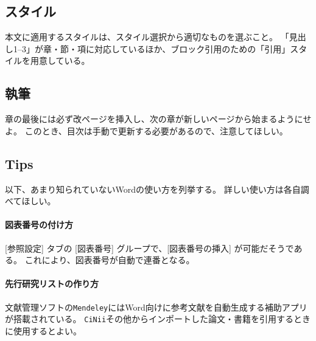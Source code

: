 		\subsection{スタイル}
			\label{sub:style_w}

			本文に適用するスタイルは、スタイル選択から適切なものを選ぶこと。
			「見出し1--3」が章・節・項に対応しているほか、ブロック引用のための「引用」スタイルを用意している。

		\subsection{執筆}
			\label{sub:writing_w}

			章の最後には必ず改ページを挿入し、次の章が新しいページから始まるようにせよ。
			このとき、目次は手動で更新する必要があるので、注意してほしい。


		\subsection{Tips}
			\label{tips}

			以下、あまり知られていないWordの使い方を列挙する。
			詳しい使い方は各自調べてほしい。

			\paragraph{図表番号の付け方}

				[参照設定] タブの [図表番号] グループで、[図表番号の挿入] が可能だそうである。
				これにより、図表番号が自動で連番となる。

			\paragraph{先行研究リストの作り方}

				文献管理ソフトの\texttt{Mendeley}にはWord向けに参考文献を自動生成する補助アプリが搭載されている。
				\texttt{CiNii}その他からインポートした論文・書籍を引用するときに使用するとよい。
